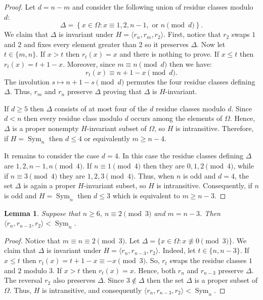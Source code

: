 \documentclass[
final
]{dmtcs-episciences}
\newtheorem{lemma}{Lemma}
\DeclareMathOperator{\Sym}{\mathrm{Sym}}
\begin{document}
\begin{proof}
Let $d=n-m$ and consider the following union of residue classes modulo $d$:
\[
\Delta
=
\left\{
x\in\Omega:
x\equiv 1,2,n-1,\text{ or }n\pmod d
\right\}.
\]
We claim that $\Delta$ is invariant under $H=\langle r_n,r_m,r_2\rangle$. First, notice that $r_2$ swaps $1$ and $2$ and fixes every element greater
than $2$ so it preserves $\Delta$. Now let $t\in\{m,n\}$. If $x>t$ then $r_t(x)=x$ and there is nothing to prove. If $x\leqslant t$ then $r_t(x)=t+1-x$. Moreover, since $m\equiv n\pmod d$ then we have:
\[
r_t(x)\equiv n+1-x\pmod d.
\]
The involution $s\mapsto n+1-s\pmod d$ permutes the four residue classes defining $\Delta$. Thus, $r_m$ and $r_n$ preserve $\Delta$ proving that $\Delta$ is $H$-invariant.

If $d\geqslant 5$ then $\Delta$ consists of at most four of the $d$ residue classes modulo $d$. Since $d<n$ then every residue class modulo $d$ occurs among the elements of $\Omega$. Hence, $\Delta$ is a proper nonempty $H$-invariant subset of $\Omega$, so $H$ is intransitive. Therefore, if $H=\Sym_n$ then $d \leqslant 4$ or equivalently $m\geqslant n-4$.

It remains to consider the case $d=4$. In this case the residue classes defining $\Delta$ are $1, 2, n-1, n\pmod4$. 
If $n\equiv1\pmod4$ then they are $0,1,2\pmod4$, while if $n\equiv3\pmod4$ they are $1,2,3\pmod4.$ Thus, when $n$ is odd and $d=4$, the set $\Delta$ is again a proper $H$-invariant subset, so $H$ is intransitive. Consequently, if $n$ is odd and $H=\Sym_n$ then $d\leqslant 3$ which is equivalent to $m\geqslant n-3$.
\end{proof}

\begin{lemma}\label{rem:6k+1/5}
Suppose that $n\geqslant 6$,  $n\equiv 2\pmod 3$ and $m=n-3$. Then $\langle r_n,r_{n-3},r_2\rangle<\Sym_n$.
\end{lemma}
\begin{proof} Notice that $m\equiv n\equiv2\pmod3$. Let $\Delta=\{x\in\Omega:x\not\equiv0\pmod3\}$. We claim that $\Delta$ is invariant under $H=\langle r_n,r_{n-3},r_2\rangle$. Indeed, let $t\in\{n,n-3\}$. If $x\leqslant t$ then $r_t(x)=t+1-x\equiv -x\pmod3$. So, $r_t$ swaps the residue classes $1$ and $2$ modulo $3$. If $x>t$ then $r_t(x)=x$. Hence, both $r_n$ and $r_{n-3}$ preserve $\Delta$. The reversal $r_2$ also preserves $\Delta$. Since $3\notin\Delta$ then the set $\Delta$ is a proper subset of $\Omega$. Thus, $H$ is intransitive, and consequently $\langle r_n,r_{n-3},r_2\rangle<\Sym_n$.
\end{proof}
\end{document}
